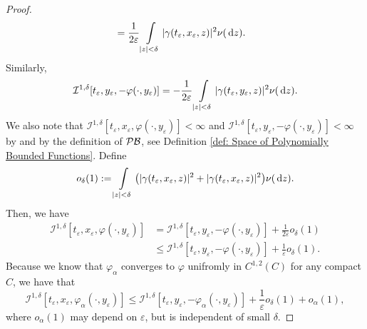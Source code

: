 \begin{proof}
\begin{align*}
        &= \frac{1}{2\varepsilon} \int\limits_{|z|<\delta} |\gamma(t_\varepsilon, x_\varepsilon,z)|^2 \nu(\,\mathrm{d} z).
    \end{align*}
    Similarly,
    \begin{equation*}
        \mathcal{I}^{1,\delta}[t_\varepsilon, y_\varepsilon, -\varphi(\cdot,y_\varepsilon)] = - \frac{1}{2\varepsilon} \int\limits_{|z|<\delta} |\gamma(t_\varepsilon, y_\varepsilon,z)|^2 \nu(\,\mathrm{d} z).
    \end{equation*}
    We also note that $\mathcal{I}^{1,\delta}[t_\varepsilon, x_\varepsilon, \varphi(\cdot, y_\varepsilon)]< \infty$ and $\mathcal{I}^{1,\delta}[t_\varepsilon, y_\varepsilon, -\varphi(\cdot,y_\varepsilon)] < \infty$ by  and by the definition of $\mathcal{PB}$, see Definition \ref{def: Space of Polynomially Bounded Functions}. Define 
    \begin{equation*}
        o_\delta(1) := \int\limits_{|z|<\delta} \big( |\gamma(t_\varepsilon,x_\varepsilon,z)|^2 + |\gamma(t_\varepsilon,x_\varepsilon,z)|^2 \big) \nu (\,\mathrm{d} z).
    \end{equation*}
    Then, we have
    \begin{align*}
        \mathcal{I}^{1,\delta} [t_\varepsilon, x_\varepsilon, \varphi(\cdot, y_\varepsilon)] &= \mathcal{I}^{1,\delta}[t_\varepsilon, y_\varepsilon, -\varphi(\cdot,y_\varepsilon)] + \frac{1}{2\varepsilon} o_\delta(1) \\
        & \leq \mathcal{I}^{1,\delta}[t_\varepsilon, y_\varepsilon, -\varphi(\cdot,y_\varepsilon)] + \frac{1}{\varepsilon} o_\delta(1).
    \end{align*}
    Because we know that $\varphi_\alpha$ converges to $\varphi$ unifromly in $C^{1,2}(C)$ for any compact $C$, we have that
    \begin{equation*}
        \mathcal{I}^{1,\delta} [t_\varepsilon, x_\varepsilon, \varphi_\alpha(\cdot, y_\varepsilon)] \leq \mathcal{I}^{1,\delta}[t_\varepsilon, y_\varepsilon, -\varphi_\alpha(\cdot,y_\varepsilon)] + \frac{1}{\varepsilon} o_\delta(1) + o_\alpha(1),
    \end{equation*}
    where $o_\alpha(1)$ may depend on $\varepsilon$, but is independent of small $\delta$. 


\end{proof}
